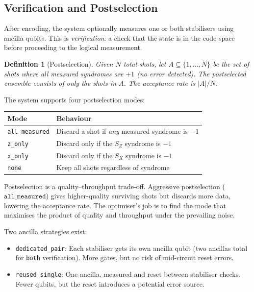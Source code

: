 \documentclass[11pt,a4paper]{article}
\newtheorem{definition}{Definition}[section]
\newcommand{\code}[1]{\texttt{#1}}
\begin{document}
\subsection{Verification and Postselection}
\label{sec:verification}

After encoding, the system optionally measures one or both stabilisers using
ancilla qubits. This is \emph{verification}: a check that the state is in the
code space before proceeding to the logical measurement.

\begin{definition}[Postselection]
\label{def:postselection}
Given $N$ total shots, let $A \subseteq \{1, \ldots, N\}$ be the set of shots
where all measured syndromes are $+1$ (no error detected). The
\emph{postselected ensemble} consists of only the shots in $A$. The
\emph{acceptance rate} is $|A|/N$.
\end{definition}

The system supports four postselection modes:
\begin{center}
\begin{tabular}{lp{8cm}}
\toprule
\textbf{Mode} & \textbf{Behaviour} \\
\midrule
\code{all\_measured} & Discard a shot if \emph{any} measured syndrome is $-1$ \\
\code{z\_only}       & Discard only if the $S_Z$ syndrome is $-1$ \\
\code{x\_only}       & Discard only if the $S_X$ syndrome is $-1$ \\
\code{none}          & Keep all shots regardless of syndrome \\
\bottomrule
\end{tabular}
\end{center}

\begin{intuition}
Postselection is a quality--throughput trade-off. Aggressive postselection
($\code{all\_measured}$) gives higher-quality surviving shots but discards
more data, lowering the acceptance rate. The optimiser's job is to find the
mode that maximises the product of quality and throughput under the prevailing
noise.
\end{intuition}

Two ancilla strategies exist:
\begin{itemize}
  \item \code{dedicated\_pair}: Each stabiliser gets its own ancilla qubit
    (two ancillas total for \code{both} verification). More gates, but no
    risk of mid-circuit reset errors.
  \item \code{reused\_single}: One ancilla, measured and reset between
    stabiliser checks. Fewer qubits, but the reset introduces a potential
    error source.
\end{itemize}
\end{document}
